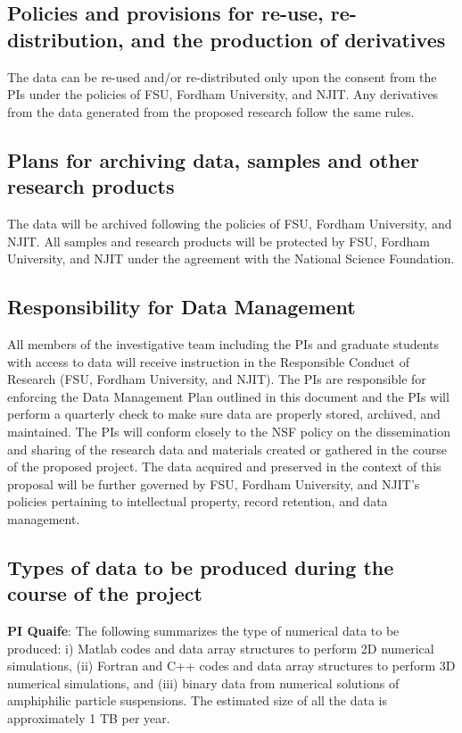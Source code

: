 \documentclass[11pt]{article}
\begin{document}
\subsection*{Policies and provisions for re-use, re-distribution, and
the production of derivatives}
The data can be re-used and/or re-distributed only upon the consent from
the PIs under the policies of FSU, Fordham University, and NJIT. Any
derivatives from the data generated from the proposed research follow
the same rules.

\subsection*{Plans for archiving data, samples and other research
products}
The data will be archived following the policies of FSU, Fordham
University, and NJIT. All samples and research products will be
protected by FSU, Fordham University, and NJIT under the agreement with
the National Science Foundation.

\subsection*{Responsibility for Data Management}
All members of the investigative team including the PIs and graduate
students with access to data will receive instruction in the Responsible
Conduct of Research (FSU, Fordham University, and NJIT). The PIs are
responsible for enforcing the Data Management Plan outlined in this
document and the PIs will perform a quarterly check to make sure data
are properly stored, archived, and maintained. The PIs will conform
closely to the NSF policy on the dissemination and sharing of the
research data and materials created or gathered in the course of the
proposed project. The data acquired and preserved in the context of this
proposal will be further governed by FSU, Fordham University, and NJIT's
policies pertaining to intellectual property, record retention, and data
management.

\subsection*{Types of data to be produced during the course of the
project}
{\bf PI Quaife}: The following summarizes the type of numerical data to
be produced: i) Matlab codes and data array structures to perform 2D
numerical simulations, (ii) Fortran and C++ codes and data array
structures to perform 3D numerical simulations, and (iii) binary data
from numerical solutions of amphiphilic particle suspensions. The
estimated size of all the data is approximately 1 TB per year. 
\end{document}
